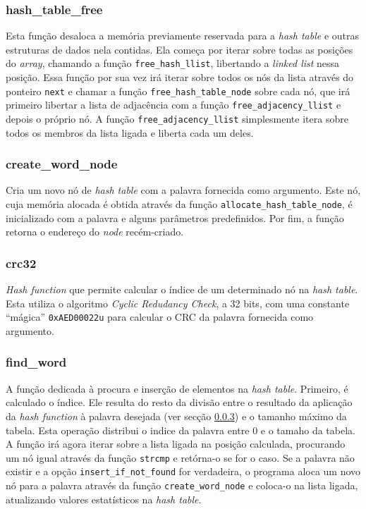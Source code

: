 \documentclass[portuguese,11pt,a4paper,titlepage]{article}
\newcommand{\foreign}[1]{\textit{#1}}
\begin{document}
\subsubsection{hash\_table\_free}
Esta função desaloca a memória previamente reservada para a \foreign{hash table} e outras
estruturas de dados nela contidas. Ela começa por iterar sobre todas as posições do \foreign{array}, chamando a função \verb|free_hash_llist|, libertando a \foreign{linked list} nessa posição. Essa função por sua vez irá iterar sobre todos os nós da lista através
do ponteiro \verb|next| e chamar a função \verb|free_hash_table_node| sobre cada nó, que irá primeiro libertar a lista de adjacência com a função \verb|free_adjacency_llist| e depois o próprio nó. A função \verb|free_adjacency_llist| simplesmente itera sobre todos
os membros da lista ligada e liberta cada um deles.

\subsubsection{create\_word\_node}
Cria um novo nó de \textit{hash table} com a palavra fornecida como argumento. Este nó, cuja memória alocada é obtida através da função \verb|allocate_hash_table_node|, é inicializado com a palavra e alguns parâmetros predefinidos. Por fim, a função retorna o endereço do \textit{node} recém-criado.

\subsubsection{crc32}\label{sssec:crc32}
\textit{Hash function} que permite calcular o índice de um determinado nó na \textit{hash table}. Esta utiliza o algoritmo \textit{Cyclic Redudancy Check}, a 32 bits, com uma constante ``mágica'' \verb|0xAED00022u| para calcular o CRC da palavra fornecida como argumento.

\subsubsection{find\_word}
A função dedicada à procura e inserção de elementos na \foreign{hash table}. Primeiro, é
calculado o índice. Ele resulta do resto da divisão entre o resultado da
aplicação da \foreign{hash function} à palavra desejada (ver secção \ref{sssec:crc32}) e o tamanho máximo da tabela. Esta operação distribui o indice da palavra entre 0 e o tamaho da tabela. A função irá agora
iterar sobre a lista ligada na posição calculada, procurando um nó igual através da
função \verb|strcmp| e retórna-o se for o caso. Se a palavra não existir e a opção
\verb|insert_if_not_found| for verdadeira, o programa aloca um novo nó para a palavra
através da função \verb|create_word_node| e coloca-o na lista ligada, atualizando valores
estatísticos na \foreign{hash table}.
\end{document}
